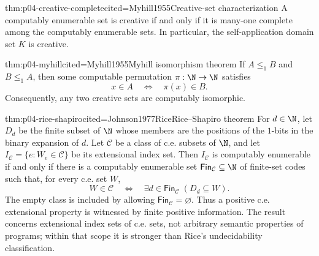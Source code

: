 \begin{hbtheorem}{thm:p04-creative-complete}{cited=Myhill1955}{Creative-set characterization}
A computably enumerable set is creative if and only if it is
many-one complete among the computably enumerable sets.  In particular, the
self-application domain set \(K\) is creative.
\end{hbtheorem}

\begin{hbtheorem}{thm:p04-myhill}{cited=Myhill1955}{Myhill isomorphism theorem}
If \(A\leq_1B\) and \(B\leq_1A\), then some computable permutation
\(\pi:\N\to\N\) satisfies
\[
 x\in A\quad\Leftrightarrow\quad\pi(x)\in B.
\]
Consequently, any two creative sets are computably isomorphic.
\end{hbtheorem}

\begin{hbtheorem}{thm:p04-rice-shapiro}{cited=Johnson1977Rice}{Rice--Shapiro theorem}
For \(d\in\N\), let \(D_d\) be the finite subset of \(\N\) whose members are
the positions of the \(1\)-bits in the binary expansion of \(d\).  Let
\(\mathcal C\) be a class of c.e. subsets of \(\N\), and let
\(I_{\mathcal C}=\{e:W_e\in\mathcal C\}\) be its extensional index set.
Then \(I_{\mathcal C}\) is computably enumerable if and only if there is a
computably enumerable set \(\mathsf{Fin}_{\mathcal C}\subseteq\N\) of
finite-set codes such
that, for every c.e. set \(W\),
\[
 W\in\mathcal C
 \quad\Leftrightarrow\quad
 \exists d\in\mathsf{Fin}_{\mathcal C}\;(D_d\subseteq W).
\]
The empty class is included by allowing
\(\mathsf{Fin}_{\mathcal C}=\varnothing\).
Thus a positive c.e. extensional property is witnessed by finite positive
information.  The result concerns extensional index sets of c.e. sets, not
arbitrary semantic properties of programs; within that scope it is stronger
than Rice's undecidability classification.
\end{hbtheorem}

